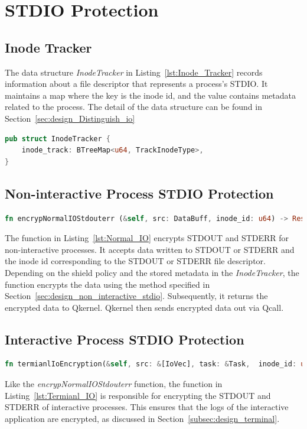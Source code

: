 \section{STDIO Protection}
\label{sec:impl_STDIO}

\subsection{Inode Tracker}
The data structure \emph{InodeTracker} in Listing~\ref{lst:Inode_Tracker} records information about a file descriptor that represents a process’s STDIO. It maintains a map where the key is the inode id, and the value contains metadata related to the process. 
The detail of the data structure can be found in Section~\ref{sec:design_Distinguish_io}


\begin{lstlisting}[language=rust, caption= API of Inode Tracker, label={lst:Inode_Tracker}]
pub struct InodeTracker {
    inode_track: BTreeMap<u64, TrackInodeType>,
} 
\end{lstlisting}

\subsection{Non-interactive Process STDIO Protection}
\begin{lstlisting}[language=rust, caption= API of normal IO shield, label={lst:Normal_IO}]
fn encrypNormalIOStdouterr (&self, src: DataBuff, inode_id: u64) -> Result<DataBuff>
\end{lstlisting}
The function in Listing~\ref{lst:Normal_IO} encrypts STDOUT and STDERR for non-interactive processes. It accepts data written to STDOUT or STDERR and the inode id corresponding to the STDOUT or STDERR file descriptor. Depending on the shield policy and the stored metadata in the \emph{InodeTracker}, 
the function encrypts the data using the method specified in Section~\ref{sec:design_non_interactive_stdio}. Subsequently, it returns the encrypted data to Qkernel. Qkernel then sends encrypted data out via Qcall.



\subsection{Interactive Process STDIO Protection}
\begin{lstlisting}[language=rust, caption= API of system call interceptor, label={lst:Termianl_IO}]
fn termianlIoEncryption(&self, src: &[IoVec], task: &Task,  inode_id: u64) -> Result<(Vec::<IoVec>)
\end{lstlisting}
Like the \emph{encrypNormalIOStdouterr} function, the function in Listing~\ref{lst:Termianl_IO} is responsible for encrypting the STDOUT and STDERR of interactive processes. This ensures that the logs of the interactive application are encrypted, as discussed in Section~\ref{subsec:design_terminal}.

